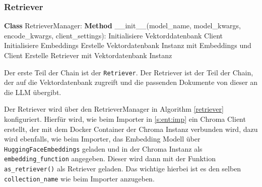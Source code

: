 \subsubsection{Retriever}
\begin{algorithm}
    \caption{Retriever Initialisierung}
    \begin{algorithmic}[1]
    \STATE \textbf{Class} RetrieverManager:
    \STATE \textbf{Method} \_\_init\_\_(model\_name, model\_kwargs, encode\_kwargs, client\_settings):
    \STATE \quad Initialisiere Vektorddatenbank Client
    \STATE \quad Initialisiere Embeddings 
    \STATE \quad Erstelle Vektordatenbank Instanz mit Embeddings und Client
    \STATE \quad Erstelle Retriever mit Vektordatenbank Instanz
    \end{algorithmic}
    \label{retriever}
    \end{algorithm}
Der erste Teil der Chain ist der \verb|Retriever|. 
Der Retriever ist der Teil der Chain, der auf die Vektordatenbank zugreift und 
die passenden Dokumente von dieser an die LLM übergibt.\par
Der Retriever wird über den RetrieverManager in Algorithm \ref{retriever} konfiguriert.
Hierfür wird, wie beim Importer in \ref*{s:ent:imp} ein Chroma Client erstellt, der 
mit dem Docker Container der Chroma Instanz verbunden wird, dazu wird ebenfalls,
wie beim Importer, das Embedding Modell über \verb|HuggingFaceEmbeddings| geladen
und in der Chroma Instanz als \verb|embedding_function| angegeben.
Dieser wird dann mit der Funktion \verb|as_retriever()| als Retriever geladen.
Das wichtige hierbei ist es den selben \verb|collection_name| wie beim Importer 
anzugeben.\par

